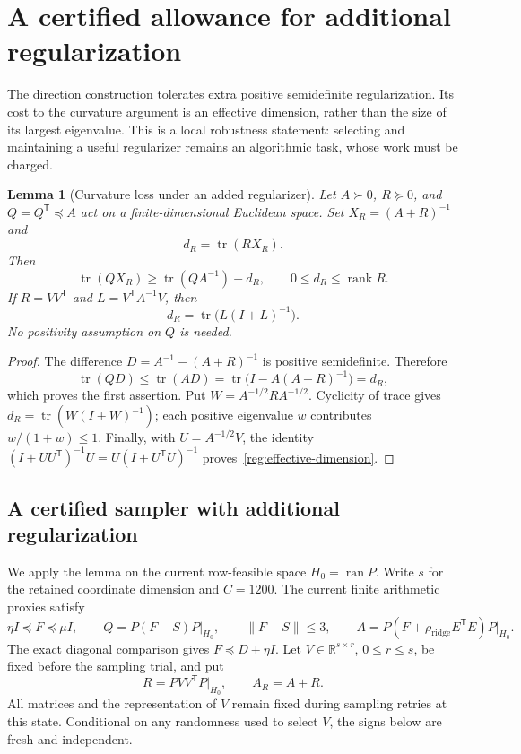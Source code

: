 \documentclass[11pt]{amsart}
\newtheorem{lemma}[theorem]{Lemma}
\theoremstyle{definition}\newtheorem{definition}[theorem]{Definition}
\theoremstyle{remark}\newtheorem{remark}[theorem]{Remark}
\numberwithin{equation}{section}
\begin{document}
\section{A certified allowance for additional regularization}
\label{reg:section}

The direction construction tolerates extra positive semidefinite
regularization.  Its cost to the curvature argument is an effective
dimension, rather than the size of its largest eigenvalue.  This is a
local robustness statement: selecting and maintaining a useful
regularizer remains an algorithmic task, whose work must be charged.

\begin{lemma}[Curvature loss under an added regularizer]
\label{reg:loss}
Let $A\succ0$, $R\succeq0$, and $Q=Q^{\mathsf T}\preceq A$ act on a
finite-dimensional Euclidean space.  Set $X_R=(A+R)^{-1}$ and
\[
 d_R=\operatorname{tr}(RX_R).
\]
Then
\begin{equation}\label{reg:loss-bound}
 \operatorname{tr}(QX_R)
 \ge \operatorname{tr}(QA^{-1})-d_R,
 \qquad 0\le d_R\le\operatorname{rank}R.
\end{equation}
If $R=VV^{\mathsf T}$ and $L=V^{\mathsf T}A^{-1}V$, then
\begin{equation}\label{reg:effective-dimension}
 d_R=\operatorname{tr}\bigl(L(I+L)^{-1}\bigr).
\end{equation}
No positivity assumption on $Q$ is needed.
\end{lemma}
\begin{proof}
The difference $D=A^{-1}-(A+R)^{-1}$ is positive semidefinite.  Therefore
\[
 \operatorname{tr}(QD)\le\operatorname{tr}(AD)
 =\operatorname{tr}\bigl(I-A(A+R)^{-1}\bigr)=d_R,
\]
which proves the first assertion.  Put $W=A^{-1/2}RA^{-1/2}$.  Cyclicity
of trace gives $d_R=\operatorname{tr}(W(I+W)^{-1})$; each positive
eigenvalue $w$ contributes $w/(1+w)\le1$.  Finally, with
$U=A^{-1/2}V$, the identity $(I+UU^{\mathsf T})^{-1}U=U(I+U^{\mathsf T}U)^{-1}$
proves~\eqref{reg:effective-dimension}.
\end{proof}

\subsection{A certified sampler with additional regularization}

We apply the lemma on the current row-feasible space $H_0=\operatorname{ran}P$.
Write $s$ for the retained coordinate dimension and $C=1200$.  The
current finite arithmetic proxies satisfy
\[
 \eta I\preceq F\preceq\mu I,\qquad
 Q=P(F-S)P\big|_{H_0},\qquad
 \|F-S\|\le3,
 \qquad
 A=P(F+\rho_{\mathrm{ridge}}E^{\mathsf T}E)P\big|_{H_0}.
\]
The exact diagonal comparison gives $F\preceq D+\eta I$.
Let $V\in\mathbb R^{s\times r}$, $0\le r\le s$, be fixed before the
sampling trial, and put
\[
 R=PVV^{\mathsf T}P\big|_{H_0},\qquad A_R=A+R.
\]
All matrices and the representation of $V$ remain fixed during sampling
retries at this state.  Conditional on any randomness used to select
$V$, the signs below are fresh and independent.
\end{document}
